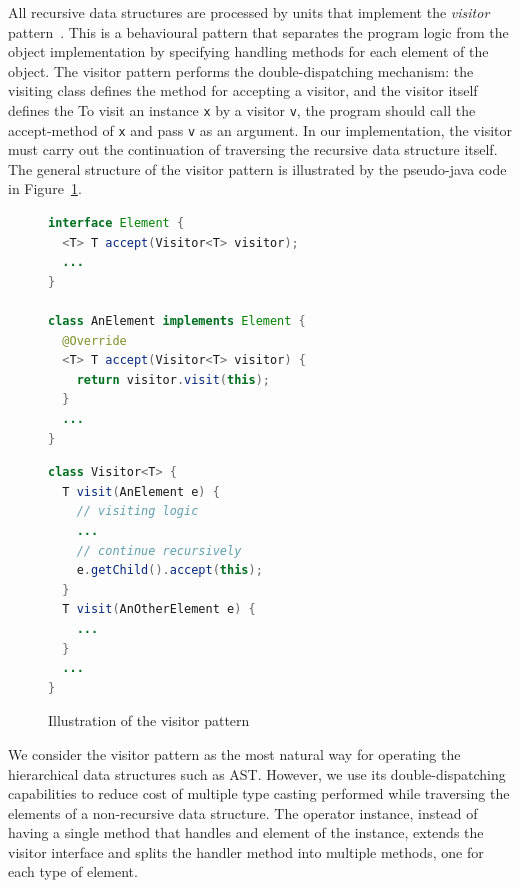 All recursive data structures are processed by units that implement the \textit{visitor} pattern~\cite{palsberg1998essence}.
This is a behavioural pattern that separates the program logic from the object implementation by specifying handling methods for each element of the object.
The visitor pattern performs the double-dispatching mechanism: the visiting class defines the method for accepting a visitor, and the visitor itself defines the 
To visit an instance \lstinline{x} by a visitor \lstinline{v}, the program should call the accept-method of \lstinline{x} and pass \lstinline{v} as an argument.
In our implementation, the visitor must carry out the continuation of traversing the recursive data structure itself.
The general structure of the visitor pattern is illustrated by the pseudo-java code in Figure~\ref{fig:visitor}.

\begin{figure}[h]
\centering
\begin{minipage}[t]{.55\textwidth}
\begin{lstlisting}[language=java]
interface Element {
  <T> T accept(Visitor<T> visitor);
  ...
}

class AnElement implements Element {
  @Override
  <T> T accept(Visitor<T> visitor) {
    return visitor.visit(this);
  }
  ...
}
\end{lstlisting}
\end{minipage}%
\begin{minipage}[t]{.45\textwidth}
\begin{lstlisting}[language=java]
class Visitor<T> {
  T visit(AnElement e) {
    // visiting logic
    ...
    // continue recursively
    e.getChild().accept(this);
  }
  T visit(AnOtherElement e) {
    ...
  }
  ...
}
\end{lstlisting}
\end{minipage}
\caption{Illustration of the visitor pattern}
\label{fig:visitor}
\end{figure}

We consider the visitor pattern as the most natural way for operating the hierarchical data structures such as AST.
However, we use its double-dispatching capabilities to reduce cost of multiple type casting performed while traversing the elements of a non-recursive data structure.
The operator instance, instead of having a single method that handles and element of the instance, extends the visitor interface and splits the handler method into multiple methods, one for each type of element.

